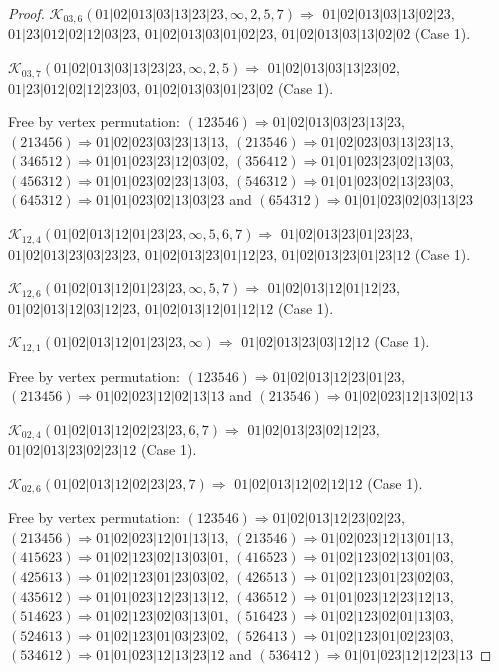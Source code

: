 \documentclass[12pt]{article}
\theoremstyle{plain}
\theoremstyle{definition}
\theoremstyle{remark}
\newcommand{\fancy}[1]{\mathcal{#1}}
\def\K{\fancy{K}}
\begin{document}
\begin{proof}
	$\K_{03,6}(01|02|013|03|13|23|23,\infty,2, 5, 7)\Rightarrow $ $01|02|013|03|13|02|23$, $01|23|012|02|12|03|23$, $01|02|013|03|01|02|23$, $01|02|013|03|13|02|02$ (Case 1).
	
	$\K_{03,7}(01|02|013|03|13|23|23,\infty,2, 5)\Rightarrow $ $01|02|013|03|13|23|02$, $01|23|012|02|12|23|03$, $01|02|013|03|01|23|02$ (Case 1).
	
	
	
	Free by vertex permutation: $(1 2 3 5 4 6)\Rightarrow 01|02|013|03|23|13|23$, $(2 1 3 4 5 6)\Rightarrow 01|02|023|03|23|13|13$, $(2 1 3 5 4 6)\Rightarrow 01|02|023|03|13|23|13$, $(3 4 6 5 1 2)\Rightarrow 01|01|023|23|12|03|02$, $(3 5 6 4 1 2)\Rightarrow 01|01|023|23|02|13|03$, $(4 5 6 3 1 2)\Rightarrow 01|01|023|02|23|13|03$, $(5 4 6 3 1 2)\Rightarrow 01|01|023|02|13|23|03$, $(6 4 5 3 1 2)\Rightarrow 01|01|023|02|13|03|23$ and $(6 5 4 3 1 2)\Rightarrow 01|01|023|02|03|13|23$
	
	
	
	\bigskip
	
	$\K_{12,4}(01|02|013|12|01|23|23,\infty,5, 6, 7)\Rightarrow $ $01|02|013|23|01|23|23$, $01|02|013|23|03|23|23$, $01|02|013|23|01|12|23$, $01|02|013|23|01|23|12$ (Case 1).
	
	$\K_{12,6}(01|02|013|12|01|23|23,\infty,5, 7)\Rightarrow $ $01|02|013|12|01|12|23$, $01|02|013|12|03|12|23$, $01|02|013|12|01|12|12$ (Case 1).
	
	$\K_{12,1}(01|02|013|12|01|23|23,\infty)\Rightarrow $ $01|02|013|23|03|12|12$ (Case 1).
	
	
	
	Free by vertex permutation: $(1 2 3 5 4 6)\Rightarrow 01|02|013|12|23|01|23$, $(2 1 3 4 5 6)\Rightarrow 01|02|023|12|02|13|13$ and $(2 1 3 5 4 6)\Rightarrow 01|02|023|12|13|02|13$
	
	
	
	\bigskip
	
	$\K_{02,4}(01|02|013|12|02|23|23,6, 7)\Rightarrow $ $01|02|013|23|02|12|23$, $01|02|013|23|02|23|12$ (Case 1).
	
	$\K_{02,6}(01|02|013|12|02|23|23,7)\Rightarrow $ $01|02|013|12|02|12|12$ (Case 1).
	
	
	
	Free by vertex permutation: $(1 2 3 5 4 6)\Rightarrow 01|02|013|12|23|02|23$, $(2 1 3 4 5 6)\Rightarrow 01|02|023|12|01|13|13$, $(2 1 3 5 4 6)\Rightarrow 01|02|023|12|13|01|13$, $(4 1 5 6 2 3)\Rightarrow 01|02|123|02|13|03|01$, $(4 1 6 5 2 3)\Rightarrow 01|02|123|02|13|01|03$, $(4 2 5 6 1 3)\Rightarrow 01|02|123|01|23|03|02$, $(4 2 6 5 1 3)\Rightarrow 01|02|123|01|23|02|03$, $(4 3 5 6 1 2)\Rightarrow 01|01|023|12|23|13|12$, $(4 3 6 5 1 2)\Rightarrow 01|01|023|12|23|12|13$, $(5 1 4 6 2 3)\Rightarrow 01|02|123|02|03|13|01$, $(5 1 6 4 2 3)\Rightarrow 01|02|123|02|01|13|03$, $(5 2 4 6 1 3)\Rightarrow 01|02|123|01|03|23|02$, $(5 2 6 4 1 3)\Rightarrow 01|02|123|01|02|23|03$, $(5 3 4 6 1 2)\Rightarrow 01|01|023|12|13|23|12$ and $(5 3 6 4 1 2)\Rightarrow 01|01|023|12|12|23|13$
	

\end{proof}
\end{document}
